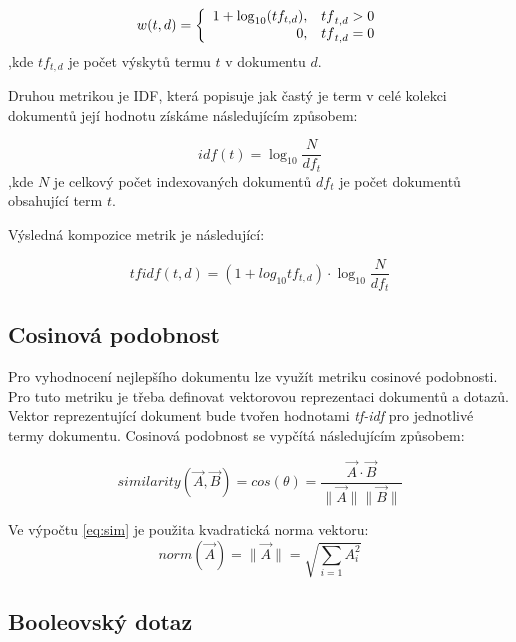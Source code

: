 \documentclass[12pt, a4paper]{article}
\begin{document}
\begin{equation}
w(t,d) = \left\{ \begin{array}{r@{\quad}c}
    1 + \log_{10}(tf_{t,d}), & {tf}_{t,d} > 0 \\
    0, & {tf}_{t,d} = 0 \\ \end{array} \right.
\end{equation}
,kde $tf_{t,d}$ je počet výskytů termu $t$ v dokumentu $d$.

Druhou metrikou je IDF, která popisuje jak častý je term v celé kolekci dokumentů její hodnotu získáme následujícím způsobem:

\begin{equation}
idf(t) = \log_{10}\frac{N}{df_{t}}
\end{equation}
,kde $N$ je celkový počet indexovaných dokumentů $df_{t}$ je počet dokumentů obsahující term $t$.


Výsledná kompozice metrik je následující:

\begin{equation}
tfidf(t,d) = (1 + log_{10}tf_{t,d}) \cdot \log_{10}\frac{N}{df_{t}}
\end{equation}


\subsection{Cosinová podobnost}

Pro vyhodnocení nejlepšího dokumentu lze využít metriku cosinové podobnosti. Pro tuto metriku je třeba definovat vektorovou reprezentaci dokumentů a dotazů. Vektor reprezentující dokument bude tvořen hodnotami \emph{tf-idf} pro jednotlivé termy dokumentu. Cosinová podobnost se vypčítá následujícím způsobem:

\begin{equation}
\label{eq:sim}
 similarity(\vec{A}, \vec{B}) = cos(\theta) = \frac{\vec{A} \cdot \vec{B}}{\parallel\vec{A}\parallel\parallel\vec{B}\parallel} 
\end{equation}

Ve výpočtu \ref{eq:sim} je použita kvadratická norma vektoru:
\begin{equation}
 norm(\vec{A}) = \parallel\vec{A}\parallel = \sqrt{\sum_{i=1} A_{i}^{2}} 
\end{equation}

\subsection{Booleovský dotaz}
\end{document}
